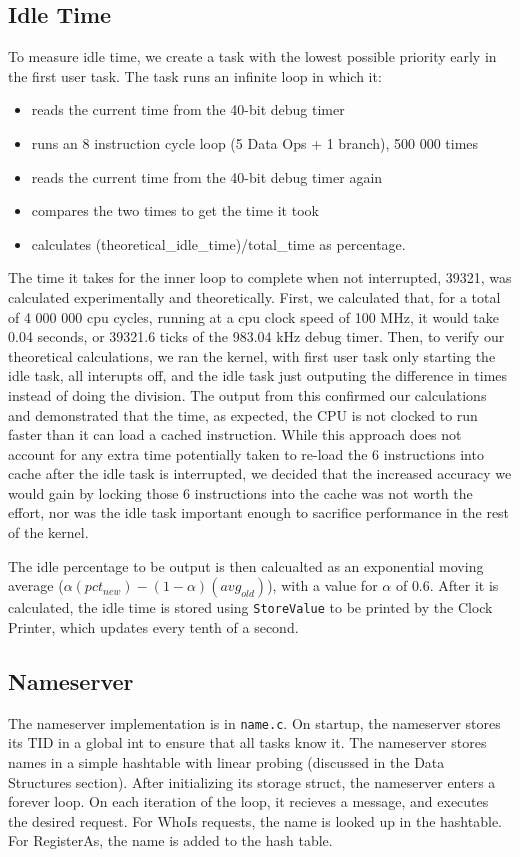 \documentclass{article}
\begin{document}
\subsection{Idle Time}
To measure idle time, we create a task with the lowest possible priority early in the first user task. The task runs an infinite loop in which it:
\begin{itemize}
    \item reads the current time from the 40-bit debug timer
    \item runs an 8 instruction cycle loop (5 Data Ops + 1 branch), 500 000 times
    \item reads the current time from the 40-bit debug timer again
    \item compares the two times to get the time it took
    \item calculates (theoretical\_idle\_time)/total\_time as percentage.
\end{itemize}
The time it takes for the inner loop to complete when not interrupted, 39321, was calculated experimentally and theoretically. First, we calculated that, for a total of 4 000 000 cpu cycles, running at a cpu clock speed of 100 MHz, it would take 0.04 seconds, or 39321.6 ticks of the 983.04 kHz debug timer. Then, to verify our theoretical calculations, we ran the kernel, with first user task only starting the idle task, all interupts off, and the idle task just outputing the difference in times instead of doing the division. The output from this confirmed our calculations and demonstrated that the time, as expected, the CPU is not clocked to run faster than it can load a cached instruction. While this approach does not account for any extra time potentially taken to re-load the 6 instructions into cache after the idle task is interrupted, we decided that the increased accuracy we would gain by locking those 6 instructions into the cache was not worth the effort, nor was the idle task important enough to sacrifice performance in the rest of the kernel.

The idle percentage to be output is then calcualted as an exponential moving average ($\alpha(pct_{new}) - (1 - \alpha)(avg_{old})$), with a value for $\alpha$ of $0.6$.
After it is calculated, the idle time is stored using \verb|StoreValue| to be printed by the Clock Printer, which updates every tenth of a second.

\subsection{Nameserver}
The nameserver implementation is in \verb|name.c|.
On startup, the nameserver stores its TID in a global int to ensure that all tasks know it.
The nameserver stores names in a simple hashtable with linear probing (discussed in the Data Structures section).
After initializing its storage struct, the nameserver enters a forever loop.
On each iteration of the loop, it recieves a message, and executes the desired request.
For WhoIs requests, the name is looked up in the hashtable.
For RegisterAs, the name is added to the hash table.
\end{document}
